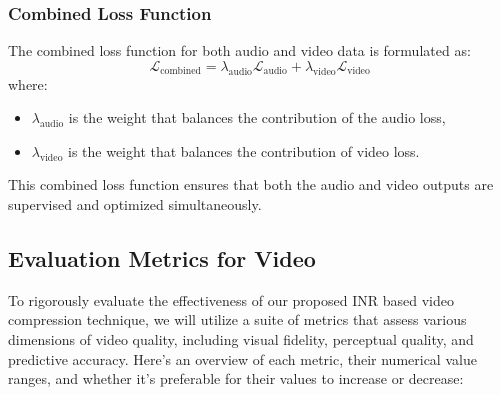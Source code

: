 \documentclass{ioereport}
\begin{document}
        \subsubsection{Combined Loss Function}
        The combined loss function for both audio and video data is formulated as:
        \begin{equation}
            \mathcal{L}_{\text{combined}} = \lambda_{\text{audio}} \mathcal{L}_{\text{audio}} + \lambda_{\text{video}} \mathcal{L}_{\text{video}}
            \end{equation}
            where:
            \begin{itemize}
                \item \( \lambda_{\text{audio}} \) is the weight that balances the contribution of the audio loss,
                \item \( \lambda_{\text{video}} \) is the weight that balances the contribution of video loss.
            \end{itemize}
    This combined loss function ensures that both the audio and video outputs are supervised and optimized simultaneously.
    
    \subsection{Evaluation Metrics for Video}
        To rigorously evaluate the effectiveness of our proposed INR based video compression technique, we will utilize a suite of metrics that assess various dimensions of video quality, including visual fidelity, perceptual quality, and predictive accuracy. Here's an overview of each metric, their numerical value ranges, and whether it's preferable for their values to increase or decrease:
\end{document}
